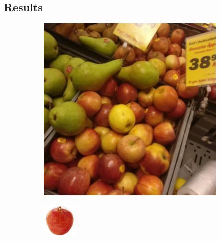 \subsection{Results}

\begin{figure}[t]
	\centering
	\begin{subfigure}[b]{0.14\textwidth}
		\centering
		\includegraphics[width=\textwidth]{PaperA/decoded-image-figure/Royal-Gala-Apple_003.jpg}
		\caption{}
		\label{subfig:royal-gala-natural}
	\end{subfigure} %
	\begin{subfigure}[b]{0.14\textwidth}
		\centering
		\includegraphics[width=\textwidth]{PaperA/decoded-image-figure/densenet_nov11/Royal-Gala-Apple_decoded.png}

\end{subfigure}
\end{figure}

